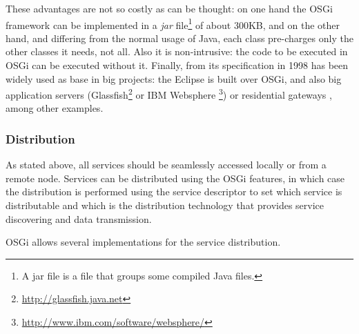 These advantages are not so
                               costly as can be thought: on one hand the OSGi
                                framework can be implemented in a
                                {\em jar} file\footnote{A jar file is
                                a file that groups some compiled Java
                                files.} of about 300KB, and on the other hand, and differing from
                                the normal usage of Java, each
                                class pre-charges only the other
                                classes it needs, not all. Also it is
                                non-intrusive: the code to be
                                executed in OSGi can be executed
                                without it. Finally, from its
                                specification in 1998 has been widely
                                used as base in big projects: the
                                Eclipse  is built over OSGi, and
                                also big application servers
                               (Glassfish\footnote{\url{http://glassfish.java.net}} 
                               or IBM Websphere \footnote{\url{http://www.ibm.com/software/websphere/}}) or
                               residential gateways
                               \cite{GarciaSanchez2013Gateway}, among other
                               examples. 



\subsubsection{Distribution}
As stated above, all services should be seamlessly accessed locally or
from a remote  node. Services can be distributed using the OSGi
features, in which case the distribution is performed using the
service descriptor to set which service is distributable and which is
the distribution technology that provides service discovering and data
transmission. %

OSGi allows several implementations for the service distribution.  %

